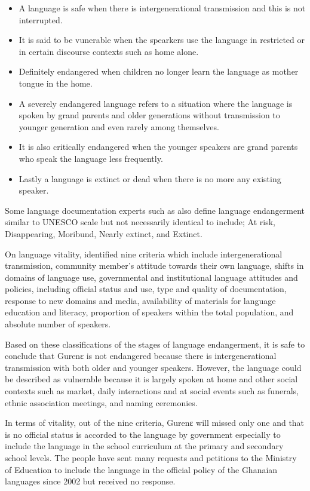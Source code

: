 \documentclass[output=paper,colorlinks,citecolor=brown]{langscibook}
\begin{document}
\begin{itemize}\sloppy
\item A language is safe when there is intergenerational transmission and this is not interrupted.
\item 	It is said to be vunerable when the spearkers use the language in restricted or in certain discourse contexts such as home alone.
\item 	Definitely endangered when children no longer learn the language as mother tongue in the home.
\item 	A severely endangered language refers to a situation where the language is spoken by grand parents and older generations without transmission to younger generation and even rarely among themselves.
\item 	It is also critically endangered when the younger speakers are grand parents who speak the language less frequently.
\item 	Lastly a language is extinct or dead when there is no more any existing speaker. 
\end{itemize}
Some language documentation experts such as \citet{GrenobleWhaley1996} also define language endangerment similar to UNESCO scale but not necessarily identical to include; At risk, Disappearing, Moribund, Nearly extinct, and Extinct.

\begin{sloppypar}
On language vitality, \citet[5]{unesco2011atlas} identified nine criteria which include intergenerational transmission, community member’s attitude towards their own language, shifts in domains of language use, governmental and institutional language attitudes and policies, including official status and use, type and quality of documentation, response to new domains and media, availability of materials for language education and literacy, proportion of speakers within the total population, and absolute number of speakers.
\end{sloppypar}

Based on these classifications of the stages of language endangerment, it is safe to conclude that Gurenɛ is not endangered because there is intergenerational transmission with both older and younger speakers. However, the language could be described as vulnerable because it is largely spoken at home and other social contexts such as market, daily interactions and at social events such as funerals, ethnic association meetings, and naming ceremonies.

In terms of vitality, out of the nine criteria, Gurenɛ will missed only one and that is no official status is accorded to the language by government especially to include the language in the school curriculum at the primary and secondary school levels. The people have sent many requests and petitions to the Ministry of Education to include the language in the official policy of the Ghanaian languages since 2002 but received no response.
\end{document}
